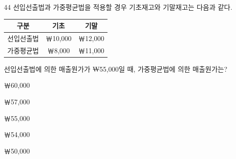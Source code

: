 \begin{question}{44}
선입선출법과 가중평균법을 적용할 경우 기초재고와 기말재고는 다음과 같다.
\par
{\small\centering
\begin{tabular}{|c|c|c|}\hline
구분 & 기초 & 기말 \\\hline
선입선출법 & ￦10,000 & ￦12,000 \\\hline
가중평균법 & ￦8,000 & ￦11,000 \\\hline
\end{tabular}\par}
선입선출법에 의한 매출원가가 ₩55,000일 때, 가중평균법에 의한 매출원가는? \par
\begin{choices}
  \item ￦60,000
  \item ￦57,000
  \item ￦55,000
  \item ￦54,000
  \item ￦50,000
\end{choices}
\end{question}
